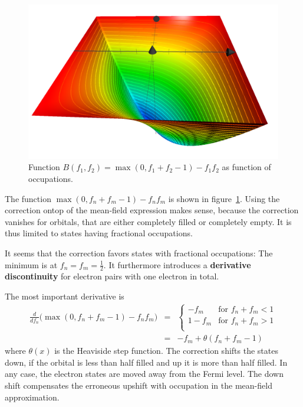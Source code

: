 \documentclass[11pt,a4paper]{report}
\begin{document}
\begin{figure}[H]
\begin{center}
\includegraphics[width=0.7\linewidth]{Figs/suppressfluctuations}
\end{center}
\caption{\label{fig:suppressfluctuations} 
Function $B(f_1,f_2)=\max(0,f_1+f_2-1)-f_1f_2$ as function of occupations.}
\end{figure}

The function $\max(0,f_n+f_m-1)-f_nf_m$ is shown in
figure~\ref{fig:suppressfluctuations}. Using the correction ontop of
the mean-field expression makes sense, because the correction vanishes
for orbitals, that are either completely filled or completely empty. It
is thus limited to states having fractional occupations. 

It seems that the correction favors states with fractional
occupations: The minimum is at $f_n=f_m=\frac{1}{2}$. It furthermore
introduces a \textbf{derivative discontinuity} for electron pairs with
one electron in total.


The most important derivative is
\begin{eqnarray}
\frac{d}{df_n}\biggl(\max(0,f_n+f_m-1)-f_nf_m\biggr)
&=&\begin{cases}
-f_m &\text{for $f_n+f_m<1$}\\
1-f_m &\text{for $f_n+f_m>1$}\\
\end{cases}
\nonumber\\
&=&
-f_m+\theta(f_n+f_m-1)
\end{eqnarray}
where $\theta(x)$ is the Heaviside step function.  The correction
shifts the states down, if the orbital is less than half filled and up
it is more than half filled. In any case, the electron states are
moved away from the Fermi level. The down shift compensates the
erroneous upshift with occupation in the mean-field approximation.




\end{document}
